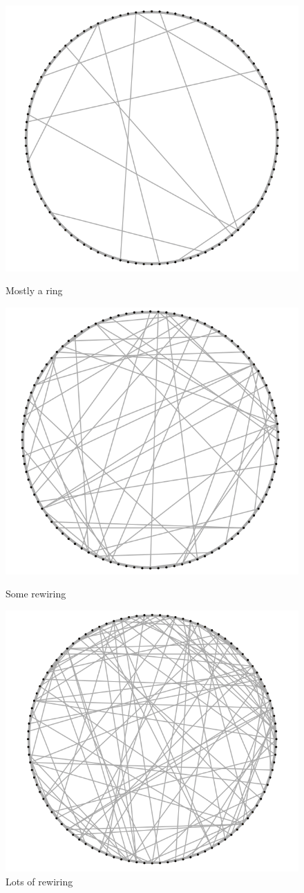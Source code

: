 \begin{figure}
\centering
\begin{minipage}{.3\textwidth}
  \centering
  \includegraphics[width=.7\linewidth]{figures/small.png}
  \caption{Mostly a ring}
  \label{fig:small}
\end{minipage}%
\begin{minipage}{.3\textwidth}
  \centering
  \includegraphics[width=.7\linewidth]{figures/medium.png}
  \caption{Some rewiring}
  \label{fig:medium}
\end{minipage}
\begin{minipage}{.3\textwidth}
  \centering
  \includegraphics[width=.7\linewidth]{figures/large.png}
  \caption{Lots of rewiring}
  \label{fig:large}
\end{minipage}
\end{figure}

